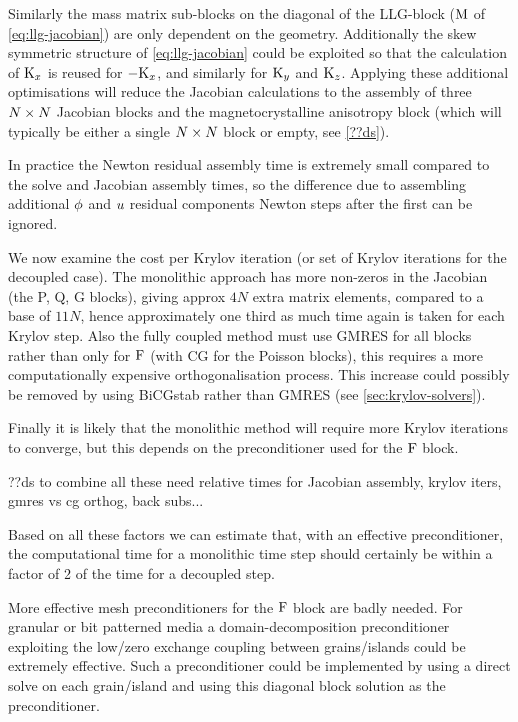 Similarly the mass matrix sub-blocks on the diagonal of the LLG-block ($\mathrm{M}$ of \cref{eq:llg-jacobian}) are only dependent on the geometry.
Additionally the skew symmetric structure of \cref{eq:llg-jacobian} could be exploited so that the calculation of $\mathrm{K}_x$ is reused for $-\mathrm{K}_x$, and similarly for $\mathrm{K}_y$ and $\mathrm{K}_z$.
Applying these additional optimisations will reduce the Jacobian calculations to the assembly of three $N \times N$ Jacobian blocks and the magnetocrystalline anisotropy block (which will typically be either a single $N \times N$ block or empty, see \cref{??ds}).


In practice the Newton residual assembly time is extremely small compared to the solve and Jacobian assembly times, so the difference due to assembling additional $\phi$ and $u$ residual components Newton steps after the first can be ignored.

We now examine the cost per Krylov iteration (or set of Krylov iterations for the decoupled case).
The monolithic approach has more non-zeros in the Jacobian (the P, Q, G blocks), giving approx $4N$ extra matrix elements, compared to a base of $11N$, hence approximately one third as much time again is taken for each Krylov step.
Also the fully coupled method must use GMRES for all blocks rather than only for $\mathrm{F}$ (with CG for the Poisson blocks), this requires a more computationally expensive orthogonalisation process.
This increase could possibly be removed by using BiCGstab rather than GMRES (see \cref{sec:krylov-solvers}).

Finally it is likely that the monolithic method will require more Krylov iterations to converge, but this depends on the preconditioner used for the $\mathrm{F}$ block.

??ds to combine all these need relative times for Jacobian assembly, krylov iters, gmres vs cg orthog, back subs...

Based on all these factors we can estimate that, with an effective preconditioner, the computational time for a monolithic time step should certainly be within a factor of 2 of the time for a decoupled step.



More effective mesh preconditioners for the $\mathrm{F}$ block are badly needed.
For granular or bit patterned media a domain-decomposition preconditioner exploiting the low/zero exchange coupling between grains/islands could be extremely effective.
Such a preconditioner could be implemented by using a direct solve on each grain/island and using this diagonal block solution as the preconditioner.

